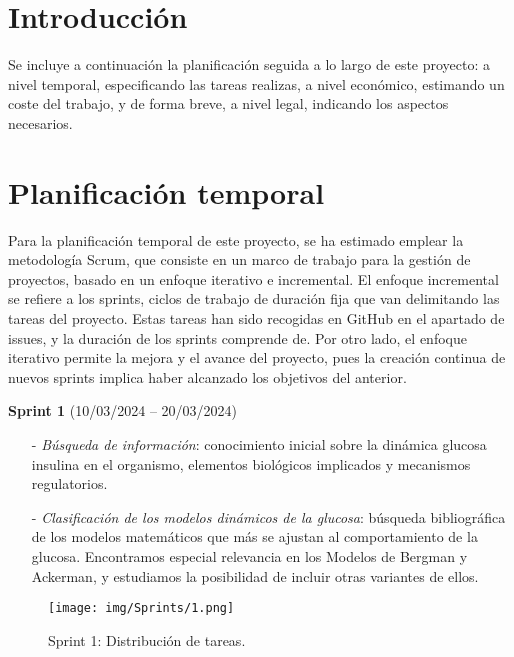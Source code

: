 
\section{Introducción}

Se incluye a continuación la planificación seguida a lo largo de este proyecto: a nivel temporal, especificando las tareas realizas, a nivel económico, estimando un coste del trabajo, y de forma breve, a nivel legal, indicando los aspectos necesarios.

\section{Planificación temporal}

Para la planificación temporal de este proyecto, se ha estimado emplear la metodología Scrum, que consiste en un marco de trabajo para la gestión de proyectos, basado en un enfoque iterativo e incremental. El enfoque incremental se refiere a los sprints, ciclos de trabajo de duración fija que van delimitando las tareas del proyecto. Estas tareas han sido recogidas en GitHub en el apartado de issues, y la duración de los sprints comprende de. Por otro lado, el enfoque iterativo permite la mejora y el avance del proyecto, pues la creación continua de nuevos sprints implica haber alcanzado los objetivos del anterior. 

\clearpage
\textbf{Sprint 1} (10/03/2024 – 20/03/2024) 
\begin{enumerate}
    \item[-] \textit{Búsqueda de información}: conocimiento inicial sobre la dinámica glucosa insulina en el organismo, elementos biológicos implicados y mecanismos regulatorios.
    \item[-] \textit{Clasificación de los modelos dinámicos de la glucosa}: búsqueda bibliográfica de los modelos matemáticos que más se ajustan al comportamiento de la glucosa. Encontramos especial relevancia en los Modelos de Bergman y Ackerman, y estudiamos la posibilidad de incluir otras variantes de ellos.
\end{enumerate}

\begin{figure}[htbp]
    \centering
    \texttt{[image: img/Sprints/1.png]}
    \caption{Sprint 1: Distribución de tareas.}
    \label{fig:sprint1}
\end{figure}

